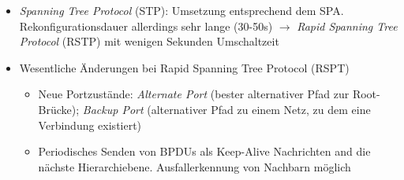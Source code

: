 \begin{itemize}
\begin{itemize}
\begin{itemize}
			\item \textit{Spanning Tree Protocol} (STP): Umsetzung entsprechend dem SPA. Rekonfigurationsdauer allerdings sehr lange (30-50s) \(\rightarrow\) \textit{Rapid Spanning Tree Protocol} (RSTP) mit wenigen Sekunden Umschaltzeit
			\item Wesentliche Änderungen bei Rapid Spanning Tree Protocol (RSPT)
			\begin{itemize}
				\item Neue Portzustände: \textit{Alternate Port} (bester alternativer Pfad zur Root-Brücke); \textit{Backup Port} (alternativer Pfad zu einem Netz, zu dem eine Verbindung existiert)
				\item Periodisches Senden von BPDUs als Keep-Alive Nachrichten and die nächste Hierarchiebene. Ausfallerkennung von Nachbarn möglich
			\end{itemize}
		\end{itemize}
	\end{itemize}
\end{itemize}

